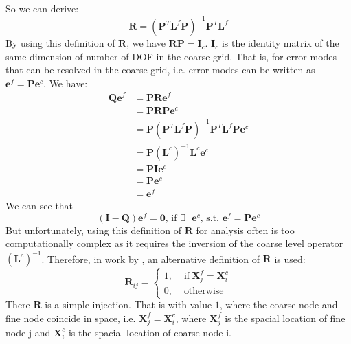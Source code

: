 So we can derive:
\begin{equation}
 \mathbf{R} = (\mathbf{P}^T\mathbf{L}^f\mathbf{P})^{-1}\mathbf{P}^T\mathbf{L}^f
\end{equation}
By using this definition of $\mathbf{R}$, we have $\mathbf{R}\mathbf{P} = \mathbf{I}_c$. $\mathbf{I}_c$ is the identity matrix of the same dimension of number of DOF in the coarse grid. That is, for error modes that can be resolved in the coarse grid, i.e. error modes can be written as $\mathbf{e}^f = \mathbf{P}\mathbf{e}^c$. We have:
\begin{align*}
\mathbf{Q}\mathbf{e}^f &= \mathbf{P}\mathbf{R}\mathbf{e}^f\\
&= \mathbf{P}\mathbf{R}\mathbf{P}\mathbf{e}^c\\
&= \mathbf{P}(\mathbf{P}^T\mathbf{L}^f\mathbf{P})^{-1}\mathbf{P}^T\mathbf{L}^f\mathbf{P}\mathbf{e}^c\\
&= \mathbf{P}(\mathbf{L}^c)^{-1}\mathbf{L}^c\mathbf{e}^c\\
&= \mathbf{P}\mathbf{I}\mathbf{e}^c\\
&= \mathbf{P}\mathbf{e}^c \\
&= \mathbf{e}^f
\end{align*}
We can see that 
\begin{equation}\label{equ:projection_Q}
(\mathbf{I} - \mathbf{Q})\mathbf{e}^f = \mathbf{0}\text{, if $\exists$ $\mathbf{e}^c$, s.t. }\mathbf{e}^f = \mathbf{P}\mathbf{e}^c
\end{equation}
But unfortunately, using this definition of $\mathbf{R}$ for analysis often is too computationally complex as it requires the inversion of the coarse level operator $(\mathbf{L}^c)^{-1}$. Therefore, in work by \cite{brezina2001algebraic}, an alternative definition of $\mathbf{R}$ is used:
\begin{equation}
\mathbf{R}_{ij} = \left\{  
\begin{aligned}
    1, & \text{ if}\ \mathbf{X}^f_j = \mathbf{X}^c_i\\
    0, & \text{ otherwise}
  \end{aligned}\right.
\end{equation}
There $\mathbf{R}$ is a simple injection. That is with value $1$, where the coarse node and fine node coincide in space, i.e. $\mathbf{X}^f_j = \mathbf{X}^c_i$, where $\mathbf{X}^f_j$ is the spacial location of fine node j and $\mathbf{X}^c_i$ is the spacial location of coarse node i.

